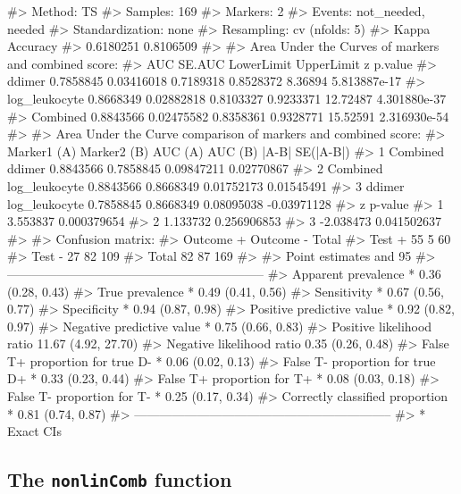 \documentclass[]{article}
\renewenvironment{verbatim}{\color{codecolor}\begin{myshaded}\begin{oldverbatim}}{\end{oldverbatim}\end{myshaded}}
\begin{document}
\begin{verbatim}
#> Method: TS 
#> Samples: 169 
#> Markers: 2 
#> Events: not_needed, needed 
#> Standardization: none 
#> Resampling: cv (nfolds: 5)
#>  Kappa       Accuracy  
#>  0.6180251   0.8106509
#> 
#> Area Under the Curves of markers and combined score:  
#>                     AUC     SE.AUC LowerLimit UpperLimit        z      p.value
#> ddimer        0.7858845 0.03416018  0.7189318  0.8528372  8.36894 5.813887e-17
#> log_leukocyte 0.8668349 0.02882818  0.8103327  0.9233371 12.72487 4.301880e-37
#> Combined      0.8843566 0.02475582  0.8358361  0.9328771 15.52591 2.316930e-54
#> 
#> Area Under the Curve comparison of markers and combined score:  
#>   Marker1 (A)   Marker2 (B)   AUC (A)   AUC (B)      |A-B|   SE(|A-B|)
#> 1    Combined        ddimer 0.8843566 0.7858845 0.09847211  0.02770867
#> 2    Combined log_leukocyte 0.8843566 0.8668349 0.01752173  0.01545491
#> 3      ddimer log_leukocyte 0.7858845 0.8668349 0.08095038 -0.03971128
#>           z     p-value
#> 1  3.553837 0.000379654
#> 2  1.133732 0.256906853
#> 3 -2.038473 0.041502637
#> 
#> Confusion matrix:  
#>           Outcome +    Outcome -      Total
#> Test +           55            5         60
#> Test -           27           82        109
#> Total            82           87        169
#> 
#> Point estimates and 95% CIs:
#> --------------------------------------------------------------
#> Apparent prevalence *                  0.36 (0.28, 0.43)
#> True prevalence *                      0.49 (0.41, 0.56)
#> Sensitivity *                          0.67 (0.56, 0.77)
#> Specificity *                          0.94 (0.87, 0.98)
#> Positive predictive value *            0.92 (0.82, 0.97)
#> Negative predictive value *            0.75 (0.66, 0.83)
#> Positive likelihood ratio              11.67 (4.92, 27.70)
#> Negative likelihood ratio              0.35 (0.26, 0.48)
#> False T+ proportion for true D- *      0.06 (0.02, 0.13)
#> False T- proportion for true D+ *      0.33 (0.23, 0.44)
#> False T+ proportion for T+ *           0.08 (0.03, 0.18)
#> False T- proportion for T- *           0.25 (0.17, 0.34)
#> Correctly classified proportion *      0.81 (0.74, 0.87)
#> --------------------------------------------------------------
#> * Exact CIs
\end{verbatim}

\hypertarget{the-nonlincomb-function}{%
\subsection{\texorpdfstring{The \texttt{nonlinComb} function}{The nonlinComb function}}\label{the-nonlincomb-function}}
\end{document}
